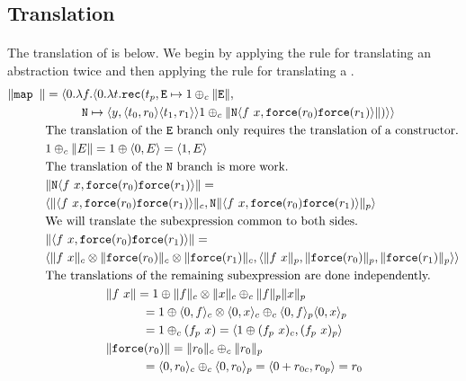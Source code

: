 \subsection{Translation}
\paragraph{}
The translation of  is below. We begin by applying the rule for
translating an abstraction twice and then applying the rule for translating a
.
%
\begin{align*}
  \|\T{map }\| &= \LP 0.\lambda f.\LP 0.\lambda t. \T{rec}(t_p, \T{E} \mapsto 1 \oplus_c \|\T{E}\|, \\
  &\quadthree \T{N} \mapsto \LP y, \LP t_0, r_0 \RP \LP t_1, r_1 \RP \RP 1 \oplus_c \|\T{N}\LP f\ x, \T{force}(r_0) \T{force}(r_1)\RP \|)\RP\RP \\
  &\text{The translation of the \T{E} branch only requires the translation of a constructor.}\\
  &1 \oplus_c \|E\| = 1 \oplus \LP 0, E \RP = \LP 1, E \RP \\
  &\text{The translation of the \T{N} branch is more work.}\\
  &\|\T{N}\LP f\ x, \T{force}(r_0) \T{force}(r_1)\RP \| = \\
  &\LP \|\LP f\ x, \T{force}(r_0) \T{force}(r_1)\RP \|_c, \T{N} \|\LP f\ x, \T{force}(r_0) \T{force}(r_1)\RP\|_p\RP \\
  &\text{We will translate the subexpression common to both sides.}\\
  &\|\LP f\ x, \T{force}(r_0) \T{force}(r_1)\RP \| = \\
  &\LP \|f\ x\|_c \otimes \|\T{force}(r_0)\|_c \otimes \|\T{force}(r_1)\|_c, \LP \|f\ x\|_p, \|\T{force}(r_0)\|_p, \|\T{force}(r_1)\|_p \RP \RP \\
  &\text{The translations of the remaining subexpression are done independently.}\\
  &\quadfive  \|f\ x\| = 1 \oplus \|f\|_c \otimes \|x\|_c \oplus_c \|f\|_p \|x\|_p \\
  &\quadeight = 1 \oplus \LP 0, f \RP_c \otimes \LP 0, x \RP_c \oplus_c \LP 0, f \RP_p \LP 0, x \RP_p \\
  &\quadeight = 1 \oplus_c (f_p\ x) = \LP 1 \oplus (f_p\ x)_c, (f_p\ x)_p \RP \\
  &\quadfive \|\T{force}(r_0)\| = \|r_0\|_c \oplus_c \|r_0\|_p \\
  &\quadeight = \LP 0, r_0 \RP_c \oplus_c \LP 0, r_0 \RP_p = \LP 0 + r_{0c}, r_{0p} \RP = r_0 \\

\end{align*}
